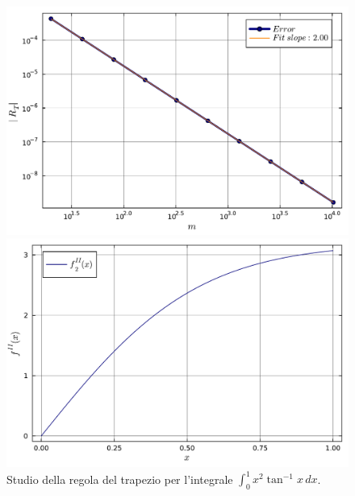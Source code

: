 \documentclass[letterpaper, 12pt]{article}
\numberwithin{equation}{section}    %
\begin{document}
\begin{figure}[!ht]
    \centering
    \begin{minipage}[b]{0.47\textwidth}
        \includegraphics[width=\textwidth]{5122.pdf}
    \end{minipage}
    \hspace{0.5cm}
    \begin{minipage}[b]{0.47\textwidth}
        \includegraphics[width=\textwidth]{5122_2.pdf}
    \end{minipage}
    \caption{Studio della regola del trapezio per l'integrale $\int_0^1 x^2 \tan^{-1}x\, dx$.}
    \label{fig:es5_1_2_2}
\end{figure}
\end{document}
